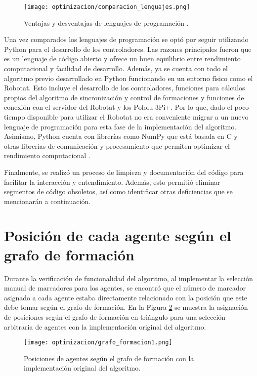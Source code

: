 \begin{figure}[H]
	\centering
	\texttt{[image: optimizacion/comparacion\_lenguajes.png]}
	\caption{Ventajas y desventajas de lenguajes de programación \cite{MatlabVsPython}.}
	\label{fig:lenguajes_programacion}
\end{figure}


Una vez comparados los lenguajes de programación se optó por seguir utilizando Python para el desarrollo de los controladores. Las razones principales fueron que es un lenguaje de código abierto y ofrece un buen equilibrio entre rendimiento computacional y facilidad de desarrollo. Además, ya se cuenta con todo el algoritmo previo desarrollado en Python funcionando en un entorno físico como el Robotat. Esto incluye el desarrollo de los controladores, funciones para cálculos propios del algoritmo de sincronización y control de formaciones y funciones de conexión con el servidor del Robotat y los Pololu 3Pi+. Por lo que, dado el poco tiempo disponible para utilizar el Robotat no era conveniente migrar a un nuevo lenguaje de programación para esta fase de la implementación del algoritmo. Asimismo, Python cuenta con librerías como NumPy que está basada en C y otras librerías de comunicación y procesamiento que permiten optimizar el rendimiento computacional \cite{PythonVsC}.

Finalmente, se realizó un proceso de limpieza y documentación del código para facilitar la interacción y entendimiento. Además, esto permitió eliminar segmentos de código obsoletos, así como identificar otras deficiencias que se mencionarán a continuación.

\section{Posición de cada agente según el grafo de formación}
Durante la verificación de funcionalidad del algoritmo, al implementar la selección manual de marcadores para los agentes, se encontró que el número de marcador asignado a cada agente estaba directamente relacionado con la posición que este debe tomar según el grafo de formación. En la Figura \ref{fig:grafo_formacion1} se muestra la asignación de posiciones según el grafo de formación en triángulo para una selección arbitraria de agentes con la implementación original del algoritmo.

\begin{figure}[H]
	\centering
	\texttt{[image: optimizacion/grafo\_formacion1.png]}
	\caption{Posiciones de agentes según el grafo de formación con la implementación original del algoritmo.}
	\label{fig:grafo_formacion1}
\end{figure}

